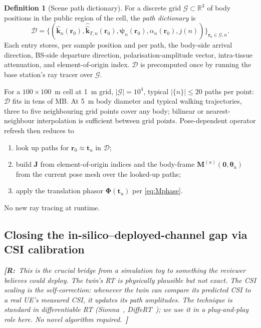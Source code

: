 \documentclass[journal,twocolumn,10pt]{IEEEtran}
\theoremstyle{definition}
\newtheorem{definition}[theorem]{Definition}
\newcommand{\robinnote}[1]{%
  {\color{red!75!black}\textit{\textbf{[R:}~#1~\textbf{]}}}}
\newcommand{\khat}{\hat{\bm{k}}}
\newcommand{\rr}{\mathbf{r}}
\newcommand{\Jmat}{\mathbf{J}}
\newcommand{\Mmat}{\mathbf{M}}
\newcommand{\Phimat}{\mathbf{\Phi}}
\newcommand{\Reals}{\mathbb{R}}
\newcommand{\Dict}{\mathcal{D}}
\begin{document}
\begin{definition}[Scene path dictionary]\label{def:dict}
For a discrete grid $\mathcal{G}\subset\Reals^3$ of body
positions in the public region of the cell, the
\emph{path dictionary} is
\begin{equation}
  \Dict=\bigl\{(\khat_n(\rr_0),\hat{\khat}_{T,n}(\rr_0),\bm\psi_n(\rr_0),\alpha_n(\rr_0),j(n))\bigr\}_{\rr_0\in\mathcal{G},n}.
\end{equation}
Each entry stores, per sample position and per path,
the body-side arrival direction, BS-side departure direction,
polarisation-amplitude vector, intra-tissue attenuation, and
element-of-origin index. $\Dict$ is precomputed once by running
the base station's ray tracer over $\mathcal{G}$.
\end{definition}

For a $100\times 100$~m cell at 1~m grid, $|\mathcal{G}|=10^4$,
typical $|\{n\}|\le 20$ paths per point: $\Dict$ fits in tens
of MB. At 5~m body diameter and typical walking
trajectories, three to five neighbouring grid points cover any
body; bilinear or nearest-neighbour interpolation is sufficient
between grid points. Pose-dependent operator refresh then
reduces to
\begin{enumerate}
\item look up paths for $\rr_0\approx\mathbf{t}_u$ in $\Dict$;
\item build $\Jmat$ from element-of-origin indices and the
      body-frame $\Mmat^{(u)}(\bm 0,\bm\theta_u)$ from the
      current pose mesh over the looked-up paths;
\item apply the translation phasor
      $\Phimat(\mathbf{t}_u)$ per \cref{eq:Mphase}.
\end{enumerate}
No new ray tracing at runtime.

\subsection{Closing the in-silico--deployed-channel gap via CSI calibration}

\robinnote{This is the crucial bridge from a simulation toy to
something the reviewer believes could deploy. The twin's RT is
\emph{physically plausible but not exact}. The CSI scaling is
the self-correction: whenever the twin can compare its predicted
CSI to a real UE's measured CSI, it updates its path
amplitudes. The technique is standard in differentiable
RT (Sionna~\cite{Sionna}, DiffeRT~\cite{DiffeRT});
we use it in a plug-and-play role here. No novel algorithm
required.}
\end{document}
